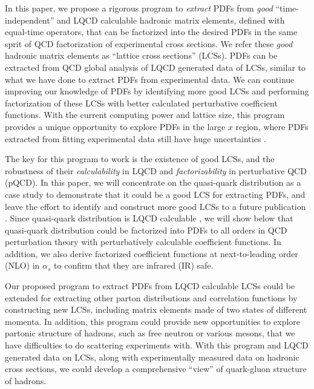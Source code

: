 \documentclass[twocolumn,aps,prl,superscriptaddress,nofootinbib,showpacs]{revtex4-1}
\begin{document}
In this paper, we propose a rigorous program to {\it extract} PDFs from {\it good} ``time-independent''  and LQCD calculable hadronic matrix elements, defined with equal-time operators, that can be factorized into the desired PDFs in the same sprit of QCD factorization of experimental cross sections.  We refer these {\it good} hadronic matrix elements as ``lattice cross sections'' (LCSs).  PDFs can be extracted from QCD global analysis of LQCD generated data of LCSs, similar to what we have done to extract PDFs from experimental data.  We can continue improving our knowledge of PDFs by identifying more good LCSs and performing factorization of these LCSs with better calculated perturbative coefficient functions.  With the current computing power and lattice size, this program provides a unique opportunity to explore PDFs in the large $x$ region, where PDFs extracted from fitting experimental data still have huge uncertainties \cite{Gao:2013xoa,Martin:2009iq,Ball:2011mu,Alekhin:2013nda}.

The key for this program to work is the existence of good LCSs, and the robustness of their {\it calculability} in LQCD and {\it factorizability} in perturbative QCD (pQCD). In this paper, we will concentrate on the quasi-quark distribution as a case study to demonstrate that it could be a good LCS for extracting PDFs, and leave the effort to identify and construct more good LCSs to a future publication \cite{Ma:2017pxb}.  Since quasi-quark distribution is LQCD calculable \cite{Lin:2014zya}, we will show below that quasi-quark distribution could be factorized into PDFs to all orders in QCD perturbation theory with perturbatively calculable coefficient functions.  In addition, we also derive factorized coefficient functions at next-to-leading order (NLO) in $\alpha_s$ to confirm that they are infrared (IR) safe.

Our proposed program to extract PDFs from LQCD calculable LCSs could be extended for extracting other parton distributions and correlation functions by constructing new LCSs, including matrix elements made of two states of different momenta.  In addition, this program could provide new opportunities to explore partonic structure of hadrons, such as free neutron or various mesons, that we have difficulties to do scattering experiments with.
With this program and LQCD generated data on LCSs, along with experimentally measured data on hadronic cross sections, we could develop a comprehensive ``view'' of quark-gluon structure of hadrons.
\end{document}
